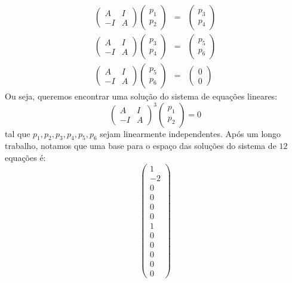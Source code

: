 \documentclass[11pt,a4paper]{article}
\begin{document}
{\[\begin{array}{rcl}
\begin{pmatrix}
A&I\\-I&A
\end{pmatrix}\begin{pmatrix}
p_1\\p_2
\end{pmatrix}&=&\begin{pmatrix}
p_3\\p_4
\end{pmatrix}\\
\begin{pmatrix}
A&I\\-I&A
\end{pmatrix}\begin{pmatrix}
p_3\\p_4
\end{pmatrix}&=&\begin{pmatrix}
p_5\\p_6
\end{pmatrix}\\
\begin{pmatrix}
A&I\\-I&A
\end{pmatrix}\begin{pmatrix}
p_5\\p_6
\end{pmatrix}&=&\begin{pmatrix}
0\\0
\end{pmatrix}
\end{array}
\]
Ou seja, queremos encontrar uma solução do sistema de equações lineares:
\[
\begin{pmatrix}
A&I\\-I&A
\end{pmatrix}^3
\begin{pmatrix}
p_1\\p_2
\end{pmatrix}
=0
\]
tal que $p_1,p_2,p_3,p_4,p_5,p_6$ sejam linearmente independentes. Após um longo trabalho, notamos que uma base para o espaço das soluções do sistema de $12$ equações é:
\[
\begin{pmatrix}
1\\-2\\0\\0\\0\\0\\1\\0\\0\\0\\0\\0

\end{pmatrix}\]}
\end{document}

